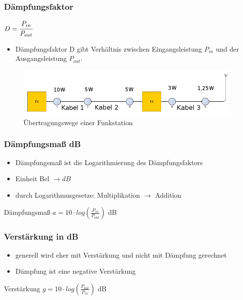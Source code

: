 \begin{frame}
  \frametitle{Dämpfungsfaktor}
  \begin{center}
    \begin{minipage}{0.3\textwidth}
      \huge{$ D = \cfrac{P_{in}}{P_{out}}$}
    \end{minipage}
    \begin{minipage}{0.6\textwidth}
      \begin{itemize}
        \item Dämpfungsfaktor D gibt Verhältnis zwischen Eingangsleistung $P_{in}$
          und der Ausgangsleistung $P_{out}$.
      \end{itemize}
    \end{minipage}
    \vspace{1cm}
    \begin{figure}
      \includegraphics[width=\textwidth,height=.4\textheight,keepaspectratio]{e10/ubertragung.png}
      \caption{Übertragungswege einer Funkstation}
    \end{figure}
  \end{center}
\end{frame}

\begin{frame}
  \frametitle{Dämpfungsmaß dB}
  \begin{itemize}
    \item Dämpfungsmaß ist die Logarithmierung des Dämpfungsfaktors
    \item Einheit Bel $\rightarrow dB$
    \item durch Logarithmusgesetze: Multiplikation $\rightarrow$ Addition
  \end{itemize}
  \vspace{0.5cm}
  \begin{block}{Dämpfungsmaß}
    \Huge{$a = 10 \cdot log(\frac{P_{in}}{P_{out}})$ dB}
  \end{block}
\end{frame}

\begin{frame}
  \frametitle{Verstärkung in dB}
  \begin{itemize}
    \item generell wird eher mit Verstärkung und nicht mit Dämpfung gerechnet
    \item Dämpfung ist eine negative Verstärkung
  \end{itemize}
  \vspace{1cm}
  \begin{block}{Verstärkung}
    \Huge{$g = 10 \cdot log(\frac{P_{out}}{P_{in}})$ dB}
  \end{block}
\end{frame}

